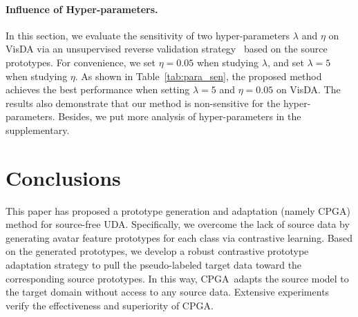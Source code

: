 \documentclass{article}
\def\ournet{CPGA}
\begin{document}
\begin{table}[t]
\vspace{-0.05in}
\renewcommand\arraystretch{1.00}
\setlength\tabcolsep{2.1pt}
\begin{center}
\end{center}
    \vspace{-0.1in}
    \caption{
 \label{tab:para_sen}Influence of the trade-off parameter $\lambda$ and $\eta$ in terms of per-class accuracy (\%) on \textbf{VisDA}. The value of $\lambda$ is chosen from $[1, 3, 5, 7, 9]$ and $\eta$ is chosen from $[0.001, 0.005, 0.01, 0.05, 0.1]$. In each experiment, the rest of hyper-parameters are fixed.
  }
\end{table}


\paragraph{Influence of Hyper-parameters.}

In this section, we evaluate the sensitivity of two hyper-parameters $\lambda$ and $\eta$ on VisDA via an unsupervised reverse validation strategy~\cite{ganin2016domain} based on the source prototypes. 
For convenience, we set $\eta=0.05$ when studying $\lambda$, and set $\lambda=5$ when studying $\eta$.
As shown in Table~\ref{tab:para_sen}, the proposed method achieves the best performance when setting $\lambda = 5$ and $\eta = 0.05$ on VisDA. 
The results also demonstrate that our method is non-sensitive for the hyper-parameters.
Besides, we put more analysis of hyper-parameters in the supplementary.


\section{Conclusions}
This paper has proposed a prototype generation and adaptation  (namely \ournet) method for source-free UDA. Specifically, we overcome the  lack of source data by generating avatar  feature prototypes for each class via contrastive learning. Based on the generated prototypes, we develop a robust contrastive prototype adaptation strategy to pull the pseudo-labeled target data toward the corresponding source prototypes. In this way, \ournet~adapts the source model to the target domain without access to any source data. Extensive experiments verify the effectiveness and superiority of \ournet.
\end{document}
